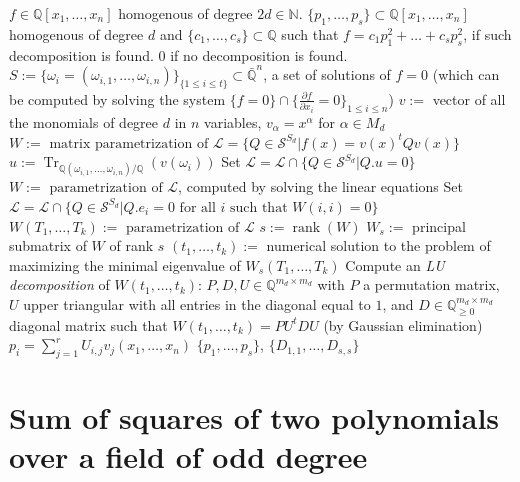 \documentclass{amsart}
\theoremstyle{definition}
\theoremstyle{remark}
\numberwithin{equation}{section}
\DeclareMathOperator{\Tr}{Tr}
\DeclareMathOperator{\rank}{rank}
\newcommand{\Sym}{{\mathcal S}}
\newcommand{\eLL}{{\mathcal L}}
\newcommand{\N}{{\mathbb N}}
\newcommand{\Q}{{\mathbb Q}}
\begin{document}
\begin{algorithm}
\label{mainAlgorithm}
\caption{Exact sum of squares decomposition}
\begin{algorithmic}
\REQUIRE $f \in \Q[x_1, \dots, x_n]$ homogenous of degree $2d \in \N$.
\ENSURE $\{p_1, \dots, p_s\} \subset \Q[x_1, \dots, x_n]$ homogenous of degree $d$ and $\{c_1, \dots, c_s\} \subset \Q$ such that $f = c_1 p_1^2 + \dots + c_s p_s^2$, if such decomposition is found. $0$ if no decomposition is found.
\STATE $S := \{\omega_i = (\omega_{i,1}, \dots, \omega_{i,n})\}_{\{1 \le i \le t\}} \subset \bar\Q^n$, a set of solutions of $f = 0$ (which can be computed by solving the system $\{f= 0\} \cap \{\frac{\partial f}{\partial x_i} = 0\}_{1 \le i \le n}$)
\STATE $v := $ vector of all the monomials of degree $d$ in $n$ variables, $v_\alpha = x^\alpha$ for $\alpha \in M_d$
\STATE $W := \text{ matrix parametrization of  } \eLL = \{Q \in \Sym^{S_d} | f(x) = v(x)^t Q v(x)\}$
{}
\STATE $u := \Tr_{\Q(\omega_{i,1}, \dots, \omega_{i,n})/\Q}(v(\omega_i))$
\STATE Set $\eLL = \eLL \cap \{Q \in \Sym^{S_d} | Q . u = 0 \}$
\STATE $W := \text{ parametrization of } \eLL$, computed by solving the linear equations
\ENDFOR
\STATE Set $\eLL = \eLL \cap \{Q \in \Sym^{S_d} | Q . e_i = 0 \text{ for all } i \text{ such that } W(i,i) = 0\}$
\STATE $W(T_1, \dots, T_k) := \text{ parametrization of } \eLL$
\STATE $s := \rank(W)$
\STATE $W_s := $ principal submatrix of $W$ of rank $s$
\STATE $(t_1, \dots, t_k) := $ numerical solution  to the problem of maximizing the minimal eigenvalue of $W_s(T_1, \dots, T_k)$
\STATE Compute an \emph{LU decomposition} of $W(t_1, \dots, t_k)$: $P, D, U \in \Q^{m_d \times m_d}$ with $P$ a permutation matrix, $U$ upper triangular with all entries in the diagonal equal to $1$, and $D \in \Q_{\ge 0}^{m_d \times m_d}$ diagonal matrix such that $W(t_1, \dots, t_k) = P U^t D U$ (by Gaussian elimination)
\STATE $p_i = \sum_{j=1}^r U_{i, j} v_j(x_1, \dots, x_n)$
\ENDFOR
\RETURN $\{p_1, \dots, p_s\}$, $\{D_{1,1}, \dots, D_{s,s}\}$
\ELSE
{}
\ENDIF
\end{algorithmic}
\end{algorithm}

\section{Sum of squares of two polynomials over a field of odd degree}
\label{section:sumoftwo}
\end{document}
